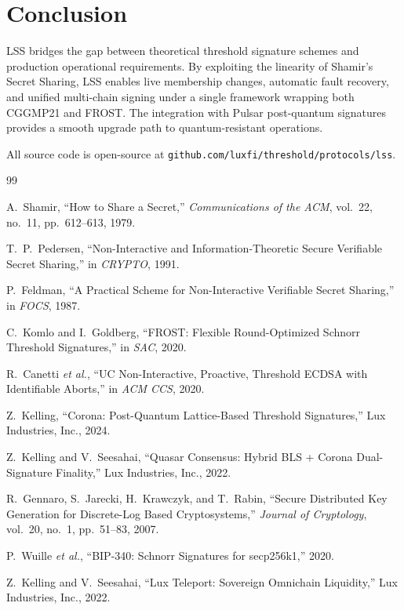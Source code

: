 \section{Conclusion}


LSS bridges the gap between theoretical threshold signature schemes and production operational requirements. By exploiting the linearity of Shamir's Secret Sharing, LSS enables live membership changes, automatic fault recovery, and unified multi-chain signing under a single framework wrapping both CGGMP21 and FROST. The integration with Pulsar post-quantum signatures provides a smooth upgrade path to quantum-resistant operations.

All source code is open-source at \texttt{github.com/luxfi/threshold/protocols/lss}.

\begin{thebibliography}{99}

 A.~Shamir, ``How to Share a Secret,'' \emph{Communications of the ACM}, vol.~22, no.~11, pp.~612--613, 1979.

 T.~P.~Pedersen, ``Non-Interactive and Information-Theoretic Secure Verifiable Secret Sharing,'' in \emph{CRYPTO}, 1991.

 P.~Feldman, ``A Practical Scheme for Non-Interactive Verifiable Secret Sharing,'' in \emph{FOCS}, 1987.

 C.~Komlo and I.~Goldberg, ``FROST: Flexible Round-Optimized Schnorr Threshold Signatures,'' in \emph{SAC}, 2020.

 R.~Canetti \emph{et al.}, ``UC Non-Interactive, Proactive, Threshold ECDSA with Identifiable Aborts,'' in \emph{ACM CCS}, 2020.

 Z.~Kelling, ``Corona: Post-Quantum Lattice-Based Threshold Signatures,'' Lux Industries, Inc., 2024.

 Z.~Kelling and V.~Seesahai, ``Quasar Consensus: Hybrid BLS + Corona Dual-Signature Finality,'' Lux Industries, Inc., 2022.

 R.~Gennaro, S.~Jarecki, H.~Krawczyk, and T.~Rabin, ``Secure Distributed Key Generation for Discrete-Log Based Cryptosystems,'' \emph{Journal of Cryptology}, vol.~20, no.~1, pp.~51--83, 2007.

 P.~Wuille \emph{et al.}, ``BIP-340: Schnorr Signatures for secp256k1,'' 2020.

 Z.~Kelling and V.~Seesahai, ``Lux Teleport: Sovereign Omnichain Liquidity,'' Lux Industries, Inc., 2022.

\end{thebibliography}

